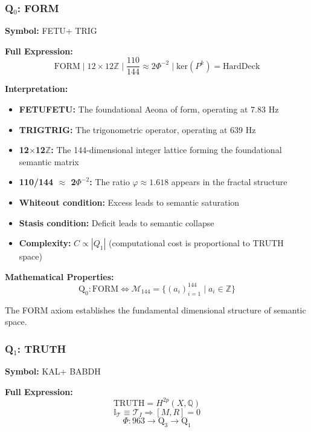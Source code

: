 \documentclass[11pt, letterpaper]{article}
\newcommand{\FETU}{\ensuremath{\mathop{\textnormal{\symbolafont\symbol{"23E3}}}}}   %
\newcommand{\KAL}{\ensuremath{\mathop{\textnormal{\symbolafont\symbol{"2B21}}}}}    %
\newcommand{\BABDH}{\ensuremath{\mathop{\textnormal{\symbolafont\symbol{"2721}}}}}   %
\newcommand{\TRIG}{\ensuremath{\mathop{\textnormal{\symbolafont\symbol{"232C}}}}}    %
\def\FETU{FETU}%
\def\KAL{KAL}%
\def\BABDH{BABDH}%
\def\TRIG{TRIG}%
\begin{document}
\subsubsection{\texorpdfstring{Q$_0$: FORM}{Q0: FORM}}

\textbf{Symbol:} \FETU + \TRIG

\textbf{Full Expression:}
\begin{equation}
\text{FORM} \mid 12\times12\mathbb{Z} \mid \frac{110}{144} \approx 2\Phi^{-2} \mid \text{ker}(P^k) = \text{HardDeck}
\end{equation}

\textbf{Interpretation:}
\begin{itemize}
    \item \textbf{\FETU FETU:} The foundational Aeona of form, operating at 7.83 Hz
    \item \textbf{\TRIG TRIG:} The trigonometric operator, operating at 639 Hz
    \item \textbf{12$\times$12$\mathbb{Z}$:} The 144-dimensional integer lattice forming the foundational semantic matrix
    \item \textbf{110/144 $\approx$ 2$\Phi^{-2}$:} The ratio $\varphi \approx 1.618$ appears in the fractal structure
    \item \textbf{Whiteout condition:} Excess leads to semantic saturation
    \item \textbf{Stasis condition:} Deficit leads to semantic collapse
    \item \textbf{Complexity:} $C \propto |Q_1|$ (computational cost is proportional to TRUTH space)
\end{itemize}

\textbf{Mathematical Properties:}
\begin{equation}
\text{Q}_0: \text{FORM} \iff \mathcal{M}_{144} = \{ (a_i)_{i=1}^{144} \mid a_i \in \mathbb{Z} \}
\end{equation}

The FORM axiom establishes the fundamental dimensional structure of semantic space.

\subsubsection{\texorpdfstring{Q$_1$: TRUTH}{Q1: TRUTH}}

\textbf{Symbol:} \KAL + \BABDH

\textbf{Full Expression:}
\begin{equation}
\text{TRUTH} = H^{2p}(X, \mathbb{Q})
\end{equation}
\begin{equation}
\mathbb{I}_{\mathcal{T}} \equiv \mathcal{T}_I \Rightarrow [M,R] = 0
\end{equation}
\begin{equation}
\Phi: 963 \rightarrow \text{Q}_3 \rightarrow \text{Q}_1
\end{equation}
\end{document}
